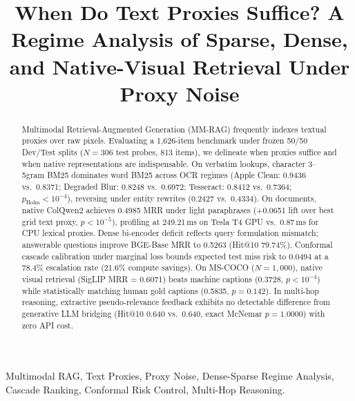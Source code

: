 \documentclass[conference]{IEEEtran}
\begin{document}
\title{When Do Text Proxies Suffice? A Regime Analysis of Sparse, Dense, and Native-Visual Retrieval Under Proxy Noise}

\author{
}

\maketitle

\begin{abstract}
Multimodal Retrieval-Augmented Generation (MM-RAG) frequently indexes textual proxies over raw pixels. Evaluating a 1,626-item benchmark under frozen 50/50 Dev/Test splits ($N=306$ test probes, 813 items), we delineate when proxies suffice and when native representations are indispensable. On verbatim lookups, character 3--5gram BM25 dominates word BM25 across OCR regimes (Apple Clean: 0.9436 vs.\ 0.8371; Degraded Blur: 0.8248 vs.\ 0.6972; Tesseract: 0.8412 vs.\ 0.7364; $p_{\text{Holm}} < 10^{-4}$), reversing under entity rewrites (0.2427 vs.\ 0.4334). On documents, native ColQwen2 achieves 0.4985 MRR under light paraphrases (+0.0651 lift over best grid text proxy, $p < 10^{-5}$), profiling at 249.21\,ms on Tesla T4 GPU vs.\ 0.87\,ms for CPU lexical proxies. Dense bi-encoder deficit reflects query formulation mismatch; answerable questions improve BGE-Base MRR to 0.5263 (Hit@10 79.74\%). Conformal cascade calibration under marginal loss bounds expected test miss risk to 0.0494 at a 78.4\% escalation rate (21.6\% compute savings). On MS-COCO ($N=1{,}000$), native visual retrieval (SigLIP MRR = 0.6071) beats machine captions (0.3728, $p < 10^{-4}$) while statistically matching human gold captions (0.5835, $p=0.142$). In multi-hop reasoning, extractive pseudo-relevance feedback exhibits no detectable difference from generative LLM bridging (Hit@10 0.640 vs.\ 0.640, exact McNemar $p = 1.0000$) with zero API cost.
\end{abstract}

\begin{IEEEkeywords}
Multimodal RAG, Text Proxies, Proxy Noise, Dense-Sparse Regime Analysis, Cascade Ranking, Conformal Risk Control, Multi-Hop Reasoning.
\end{IEEEkeywords}
\end{document}
